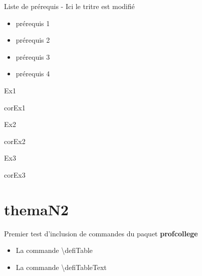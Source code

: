\documentclass[nocrop]{sesamanuel}
\begin{document}
\begin{prerequis}
    Liste de prérequis - Ici le tritre est modifié
    \begin{itemize}
    \item prérequis 1
    \item prérequis 2
    \item prérequis 3
    \item prérequis 4    
    \end{itemize}
\end{prerequis}


\begin{autoeval}
    \begin{multicols}{2}
      \begin{exercice}
        Ex1
      \end{exercice}
      \begin{corrige}
        corEx1
      \end{corrige}
      \begin{exercice}
        Ex2
      \end{exercice}
      \begin{corrige}
        corEx2
      \end{corrige}
  \vfill \columnbreak
      \begin{exercice}
        Ex3
      \end{exercice}
      \begin{corrige}
        corEx3
      \end{corrige}
    \end{multicols}
  \end{autoeval}


\chapter{themaN2}

\begin{prerequis}
    Premier test d'inclusion de commandes du paquet \textbf{profcollege}
    \begin{itemize}
    \item La commande \textbackslash defiTable{}
    \item La commande \textbackslash defiTableText{}
    \end{itemize}
\end{prerequis}
\end{document}
